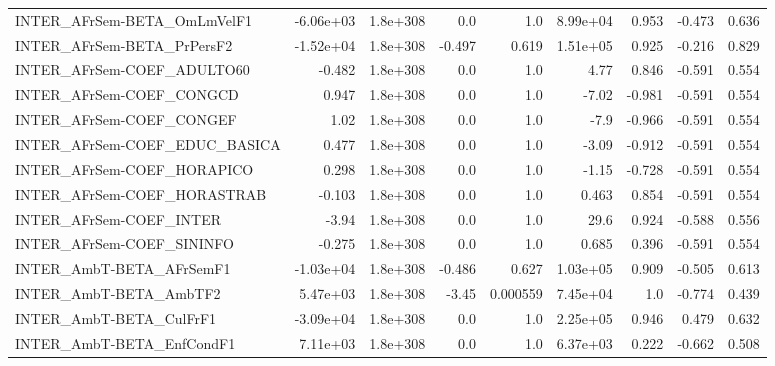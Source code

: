 \begin{tabular}{lrrrrrrrr}
INTER\_AFrSem-BETA\_OmLmVelF1           &   -6.06e+03 &     1.8e+308 &     0.0 &      1.0 &   8.99e+04 &       0.953 &       -0.473 &         0.636 \\
INTER\_AFrSem-BETA\_PrPersF2            &   -1.52e+04 &     1.8e+308 &  -0.497 &    0.619 &   1.51e+05 &       0.925 &       -0.216 &         0.829 \\
INTER\_AFrSem-COEF\_ADULTO60            &      -0.482 &     1.8e+308 &     0.0 &      1.0 &       4.77 &       0.846 &       -0.591 &         0.554 \\
INTER\_AFrSem-COEF\_CONGCD              &       0.947 &     1.8e+308 &     0.0 &      1.0 &      -7.02 &      -0.981 &       -0.591 &         0.554 \\
INTER\_AFrSem-COEF\_CONGEF              &        1.02 &     1.8e+308 &     0.0 &      1.0 &       -7.9 &      -0.966 &       -0.591 &         0.554 \\
INTER\_AFrSem-COEF\_EDUC\_BASICA         &       0.477 &     1.8e+308 &     0.0 &      1.0 &      -3.09 &      -0.912 &       -0.591 &         0.554 \\
INTER\_AFrSem-COEF\_HORAPICO            &       0.298 &     1.8e+308 &     0.0 &      1.0 &      -1.15 &      -0.728 &       -0.591 &         0.554 \\
INTER\_AFrSem-COEF\_HORASTRAB           &      -0.103 &     1.8e+308 &     0.0 &      1.0 &      0.463 &       0.854 &       -0.591 &         0.554 \\
INTER\_AFrSem-COEF\_INTER               &       -3.94 &     1.8e+308 &     0.0 &      1.0 &       29.6 &       0.924 &       -0.588 &         0.556 \\
INTER\_AFrSem-COEF\_SININFO             &      -0.275 &     1.8e+308 &     0.0 &      1.0 &      0.685 &       0.396 &       -0.591 &         0.554 \\
INTER\_AmbT-BETA\_AFrSemF1              &   -1.03e+04 &     1.8e+308 &  -0.486 &    0.627 &   1.03e+05 &       0.909 &       -0.505 &         0.613 \\
INTER\_AmbT-BETA\_AmbTF2                &    5.47e+03 &     1.8e+308 &   -3.45 & 0.000559 &   7.45e+04 &         1.0 &       -0.774 &         0.439 \\
INTER\_AmbT-BETA\_CulFrF1               &   -3.09e+04 &     1.8e+308 &     0.0 &      1.0 &   2.25e+05 &       0.946 &        0.479 &         0.632 \\
INTER\_AmbT-BETA\_EnfCondF1             &    7.11e+03 &     1.8e+308 &     0.0 &      1.0 &   6.37e+03 &       0.222 &       -0.662 &         0.508 \\

\end{tabular}
